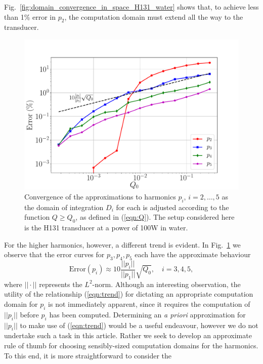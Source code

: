 \documentclass[11pt]{article}
\numberwithin{equation}{section}
\begin{document}
Fig.~\ref{fig:domain_convergence_in_space_H131_water} shows that, to achieve less than 1\% error
in $p_2$, the computation domain must extend all the way to the transducer. 
\begin{figure}[h!]
    \centering
    \includegraphics[width=\linewidth]{Figure8}
    \caption{Convergence of the approximations to harmonics $p_i$, $i=2,\ldots,5$
    as the domain of integration $D_i$ for each is adjusted according to the 
    function $Q\geq Q_0$, as defined in (\ref{eqn:Q}). The setup considered here is the H131
    transducer at a power of 100W in water.}
    \label{fig:domain_convergence_H131_water}
\end{figure}
For the higher harmonics, however, a different trend is evident. In Fig.~\ref{fig:domain_convergence_H131_water}
we observe that the error curves for $p_3,p_4,p_5$ each have the approximate behaviour
\begin{equation}
    \text{Error}(p_i) \approx 10\frac{||p_i||}{||p_1||}\sqrt{Q_0},\quad i=3,4,5,
    \label{eqn:trend}
\end{equation}
where $||\cdot||$ represents the $L^2$-norm. Although an interesting observation, 
the utility of the relationship (\ref{eqn:trend}) for dictating an appropriate 
computation domain for $p_i$ is not immediately apparent, since it requires the 
computation of $||p_i||$ before $p_i$ has been computed. Determining an \emph{a priori} 
approximation for $||p_i||$ to make use of (\ref{eqn:trend}) would be a useful
endeavour, however we do not undertake such a task in this article. Rather we 
seek to develop an approximate rule of thumb for choosing sensibly-sized computation domains 
for the harmonics. To this end, it is more straightforward to consider the 
\end{document}
